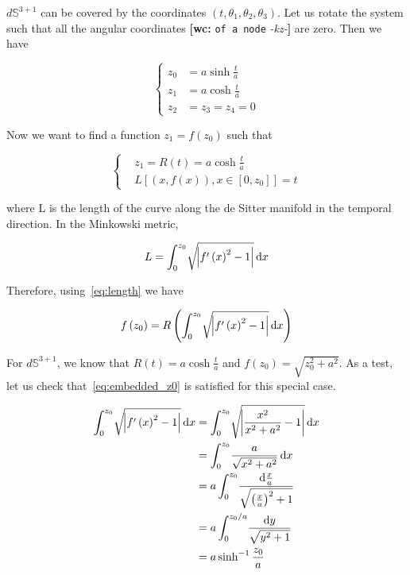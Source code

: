 \documentclass[preprint,notitlepage,amsmath,amssymb,floatfix]{revtex4-1}
\newcommand{\XXX}[3]{{\bf [#1: } {\tt #3} {\it -#2-}{\bf ]}}
\begin{document}
\noindent $d\mathbb{S}^{3+1}$ can be covered by the coordinates $\left(t,\theta_1,\theta_2,\theta_3\right)$.  Let us rotate the system such that all the angular coordinates \XXX{wc}{kz}{of a node} are zero.  Then we have

\begin{equation}
\begin{cases}
z_0 &= a\sinh\frac{t}{a} \\
z_1 &= a\cosh\frac{t}{a} \\
z_2 &= z_3 = z_4 = 0
\end{cases}
\end{equation}

\noindent Now we want to find a function $z_1 = f\left(z_0\right)$ such that 

\begin{equation}
\label{eq:length}
\begin{cases}
&z_1 = R\left(t\right) = a\cosh\frac{t}{a} \\
&L\left[\left(x,f\left(x\right)\right), x\in\left[0,z_0\right]\right] = t
\end{cases}
\end{equation}

\noindent where L is the length of the curve along the de Sitter manifold in the temporal direction.  In the Minkowski metric,

\begin{equation}
L = \int_0^{z_0}\!\sqrt{\abs{f^\prime\left(x\right)^2 - 1}}\,\mathrm dx
\end{equation}

Therefore, using~\ref{eq:length} we have

\begin{equation}
\label{eq:embedded_z0}
f\left(z_0\right) = R\left(\int_0^{z_0}\!\sqrt{\abs{f^\prime\left(x\right)^2-1}}\,\mathrm dx\right)
\end{equation}

For $d\mathbb{S}^{3+1}$, we know that $R\left(t\right) = a\cosh\frac{t}{a}$ and $f\left(z_0\right) = \sqrt{z_0^2+a^2}$.  As a test, let us check that~\ref{eq:embedded_z0} is satisfied for this special case.

\begin{equation}
\begin{split}
\int_0^{z_0}\!\sqrt{\abs{f^\prime\left(x\right)^2-1}}\,\mathrm dx &= \int_0^{z_0}\!\sqrt{\abs{\frac{x^2}{x^2+a^2}-1}}\,\mathrm dx \\
&= \int_0^{z_0}\!\frac{a}{\sqrt{x^2+a^2}}\,\mathrm dx \\
&= a\int_0^{z_0}\!\frac{\mathrm d\frac{x}{a}}{\sqrt{\left(\frac{x}{a}\right)^2+1}} \\
&= a\int_0^{z_0/a}\!\frac{\mathrm dy}{\sqrt{y^2+1}} \\
&= a\sinh^{-1}\frac{z_0}{a}
\end{split}
\end{equation}
\end{document}
